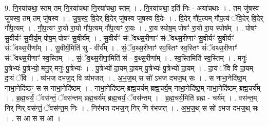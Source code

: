 \documentclass[17pt]{extarticle}
\begin{document}
9. नि॒रया॑चथा॒ स्तम् तम् नि॒रया॑चथा नि॒रया॑चथा॒ स्तम् । . नि॒रया॑चथा॒ इति॑ निः - अया॑चथाः । . तम् जु॑षस्व जुषस्व॒ तम् तम् जु॑षस्व । . जु॒ष॒स्व॒ वि॒देर् वि॒देर् जु॑षस्व जुषस्व वि॒देः । . वि॒देर् गौ॑प॒त्यम् गौ॑प॒त्यं ॅवि॒देर् वि॒देर् गौ॑प॒त्यम् । . गौ॒प॒त्यꣳ रा॒यो रा॒यो गौ॑प॒त्यम् गौ॑प॒त्यꣳ रा॒यः । . रा॒य स्पोष॒म् पोषꣳ॑ रा॒यो रा॒य स्पोष᳚म् । . पोषꣳ॑ सु॒वीर्यꣳ॑ सु॒वीर्य॒म् पोष॒म् पोषꣳ॑ सु॒वीर्य᳚म् । . सु॒वीर्यꣳ॑ संॅवथ्स॒रीणाꣳ॑ संॅवथ्स॒रीणाꣳ॑ सु॒वीर्यꣳ॑ सु॒वीर्यꣳ॑ संॅवथ्स॒रीणा᳚म् । . सु॒वीर्य॒मिति॑ सु - वीर्य᳚म् । . सं॒ॅव॒थ्स॒रीणाꣳ॑ स्व॒स्तिꣳ स्व॒स्तिꣳ सं॑ॅवथ्स॒रीणाꣳ॑ संॅवथ्स॒रीणाꣳ॑ स्व॒स्तिम् । . सं॒ॅव॒थ्स॒रीणा॒मिति॑ सं - व॒थ्स॒रीणा᳚म् । . स्व॒स्तिमिति॑ स्व॒स्तिम् । . मनुः॑ पु॒त्रेभ्यः॑ पु॒त्रेभ्यो॒ मनु॒र् मनुः॑ पु॒त्रेभ्यः॑ । . पु॒त्रेभ्यो॑ दा॒यम् दा॒यम् पु॒त्रेभ्यः॑ पु॒त्रेभ्यो॑ दा॒यम् । . दा॒यं ॅवि वि दा॒यम् दा॒यं ॅवि । . व्य॑भज दभज॒द् वि व्य॑भजत् । . अ॒भ॒ज॒थ् स सो॑ ऽभज दभज॒थ् सः । . स नाभा॒नेदि॑ष्ठ॒म् नाभा॒नेदि॑ष्ठꣳ॒॒ स स नाभा॒नेदि॑ष्ठम् । . नाभा॒नेदि॑ष्ठम् ब्रह्म॒चर्य॑म् ब्रह्म॒चर्य॒म् नाभा॒नेदि॑ष्ठ॒म् नाभा॒नेदि॑ष्ठम् ब्रह्म॒चर्य᳚म् । . ब्र॒ह्म॒चर्यं॒ ॅवस॑न्तं॒ ॅवस॑न्तम् ब्रह्म॒चर्य॑म् ब्रह्म॒चर्यं॒ ॅवस॑न्तम् । . ब्र॒ह्म॒चर्य॒मिति॑ ब्रह्म - चर्य᳚म् । . वस॑न्त॒म् निर् णिर् वस॑न्तं॒ ॅवस॑न्त॒म् निः । . निर॑भज दभज॒न् निर् णि र॑भजत् । . अ॒भ॒ज॒थ् स सो॑ ऽभज दभज॒थ् सः । . स आ स स आ । \newline
\end{document}
